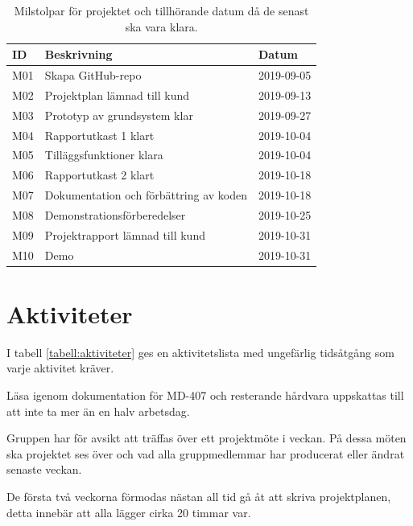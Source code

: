 \documentclass[a4paper]{article}
\begin{document}
\begin{table}[h]
\centering
\begin{tabular}{| l | l | l |}
\hline
\textbf{ID} & \textbf{Beskrivning}         & \textbf{Datum} \\ \hline
M01         & Skapa GitHub-repo            & 2019-09-05     \\ \hline
M02         & Projektplan lämnad till kund & 2019-09-13     \\ \hline
M03         & Prototyp av grundsystem klar & 2019-09-27     \\ \hline
M04         & Rapportutkast 1 klart        & 2019-10-04     \\ \hline
M05         & Tilläggsfunktioner klara     & 2019-10-04     \\ \hline
M06         & Rapportutkast 2 klart        & 2019-10-18     \\ \hline
M07         & Dokumentation och förbättring
              av koden                     & 2019-10-18     \\ \hline
M08         & Demonstrationsförberedelser  & 2019-10-25     \\ \hline
M09         & Projektrapport lämnad till
              kund                         & 2019-10-31     \\ \hline
M10         & Demo                         & 2019-10-31     \\ \hline
\end{tabular}
\caption{Milstolpar för projektet och tillhörande datum då de senast ska vara klara.}
\end{table}

\section{Aktiviteter}
\label{sec:aktiviteter}

I tabell \ref{tabell:aktiviteter} ges en aktivitetslista med ungefärlig tidsåtgång som varje aktivitet kräver.

Läsa igenom dokumentation för MD-407 och resterande hårdvara uppskattas till att inte ta mer än en halv arbetsdag.

Gruppen har för avsikt att träffas över ett projektmöte i veckan. På dessa möten ska projektet ses över och vad alla gruppmedlemmar har producerat eller ändrat senaste veckan.

De första två veckorna förmodas nästan all tid gå åt att skriva projektplanen, detta innebär att alla lägger cirka 20 timmar var.
\end{document}
